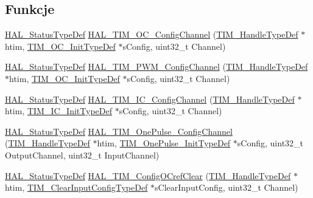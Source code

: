 \subsection*{Funkcje}
\begin{DoxyCompactItemize}
\item 
\hyperlink{stm32f4xx__hal__def_8h_a63c0679d1cb8b8c684fbb0632743478f}{H\+A\+L\+\_\+\+Status\+Type\+Def} \hyperlink{group___t_i_m___exported___functions___group8_ga6e22dfc93b7569da087a115348c3182f}{H\+A\+L\+\_\+\+T\+I\+M\+\_\+\+O\+C\+\_\+\+Config\+Channel} (\hyperlink{struct_t_i_m___handle_type_def}{T\+I\+M\+\_\+\+Handle\+Type\+Def} $\ast$htim, \hyperlink{struct_t_i_m___o_c___init_type_def}{T\+I\+M\+\_\+\+O\+C\+\_\+\+Init\+Type\+Def} $\ast$s\+Config, uint32\+\_\+t Channel)
\item 
\hyperlink{stm32f4xx__hal__def_8h_a63c0679d1cb8b8c684fbb0632743478f}{H\+A\+L\+\_\+\+Status\+Type\+Def} \hyperlink{group___t_i_m___exported___functions___group8_gac14a4959f65f51a54e8ff511242e2131}{H\+A\+L\+\_\+\+T\+I\+M\+\_\+\+P\+W\+M\+\_\+\+Config\+Channel} (\hyperlink{struct_t_i_m___handle_type_def}{T\+I\+M\+\_\+\+Handle\+Type\+Def} $\ast$htim, \hyperlink{struct_t_i_m___o_c___init_type_def}{T\+I\+M\+\_\+\+O\+C\+\_\+\+Init\+Type\+Def} $\ast$s\+Config, uint32\+\_\+t Channel)
\item 
\hyperlink{stm32f4xx__hal__def_8h_a63c0679d1cb8b8c684fbb0632743478f}{H\+A\+L\+\_\+\+Status\+Type\+Def} \hyperlink{group___t_i_m___exported___functions___group8_ga34805dabaf748c6eb823275dad2f19f5}{H\+A\+L\+\_\+\+T\+I\+M\+\_\+\+I\+C\+\_\+\+Config\+Channel} (\hyperlink{struct_t_i_m___handle_type_def}{T\+I\+M\+\_\+\+Handle\+Type\+Def} $\ast$htim, \hyperlink{struct_t_i_m___i_c___init_type_def}{T\+I\+M\+\_\+\+I\+C\+\_\+\+Init\+Type\+Def} $\ast$s\+Config, uint32\+\_\+t Channel)
\item 
\hyperlink{stm32f4xx__hal__def_8h_a63c0679d1cb8b8c684fbb0632743478f}{H\+A\+L\+\_\+\+Status\+Type\+Def} \hyperlink{group___t_i_m___exported___functions___group8_gaefb1913440053c45a4f9a50a8c05c6be}{H\+A\+L\+\_\+\+T\+I\+M\+\_\+\+One\+Pulse\+\_\+\+Config\+Channel} (\hyperlink{struct_t_i_m___handle_type_def}{T\+I\+M\+\_\+\+Handle\+Type\+Def} $\ast$htim, \hyperlink{struct_t_i_m___one_pulse___init_type_def}{T\+I\+M\+\_\+\+One\+Pulse\+\_\+\+Init\+Type\+Def} $\ast$s\+Config, uint32\+\_\+t Output\+Channel, uint32\+\_\+t Input\+Channel)
\item 
\hyperlink{stm32f4xx__hal__def_8h_a63c0679d1cb8b8c684fbb0632743478f}{H\+A\+L\+\_\+\+Status\+Type\+Def} \hyperlink{group___t_i_m___exported___functions___group8_ga0b960485369b4ebb1e5d41e5e9e49770}{H\+A\+L\+\_\+\+T\+I\+M\+\_\+\+Config\+O\+Cref\+Clear} (\hyperlink{struct_t_i_m___handle_type_def}{T\+I\+M\+\_\+\+Handle\+Type\+Def} $\ast$htim, \hyperlink{struct_t_i_m___clear_input_config_type_def}{T\+I\+M\+\_\+\+Clear\+Input\+Config\+Type\+Def} $\ast$s\+Clear\+Input\+Config, uint32\+\_\+t Channel)

\end{DoxyCompactItemize}
